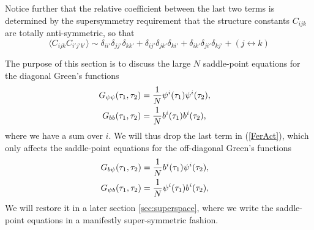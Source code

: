 \documentclass[aps,pre,preprint,onecolumn,citeautoscript,superscriptaddress,nofootinbib,eqsecnum]{revtex4-1}
\begin{document}
Notice further that the relative coefficient between the last two terms is determined by the supersymmetry requirement that the structure constants $C_{ijk}$ are totally anti-symmetric,
so that 
\begin{equation}
\langle C_{ijk} C_{i' j' k'}  \rangle \sim \delta_{ii'} \delta_{jj'} \delta_{kk'} +  \delta_{ij'} \delta_{jk'} \delta_{ki'} + \delta_{ik'} \delta_{ji'} \delta_{kj'} + (j \leftrightarrow k)
\end{equation}

The purpose of this section is to discuss the large $N$ saddle-point equations for the diagonal   
Green's functions
\begin{align}
G_{\psi \psi}(\tau_1,\tau_2)&=\frac{1}{N}\psi^i (\tau_1)\psi^i(\tau_2),\cr 
G_{b b}(\tau_1,\tau_2)& =\frac{1}{N}b^i (\tau_1)b^i (\tau_2),
\end{align}
where we have a sum over $i$. We will thus drop the last term in (\ref{FerAct}), which only affects the saddle-point equations for the off-diagonal  
Green's functions
\begin{align}
G_{b \psi}(\tau_1,\tau_2)& =\frac{1}{N}b^i (\tau_1)\psi^i (\tau_2),\cr 
G_{\psi b}(\tau_1,\tau_2)& =\frac{1}{N}\psi^i (\tau_1)b^i (\tau_2),
\end{align}
We will restore it in a later section \ref{sec:superspace}, where we write the saddle-point equations in a manifestly super-symmetric fashion. 
\end{document}
